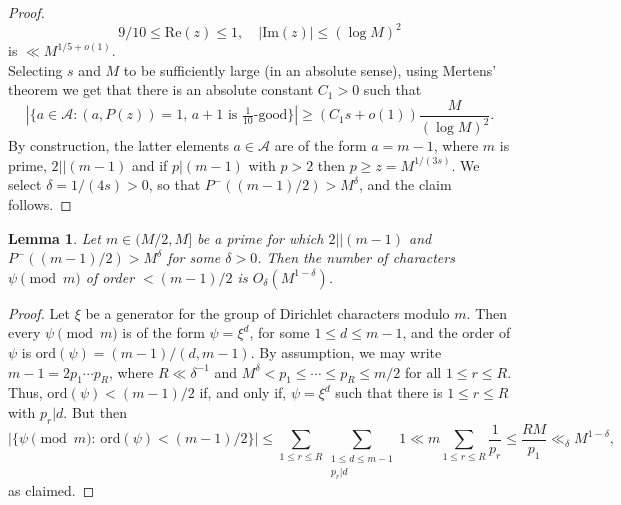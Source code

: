 \documentclass[10pt]{amsart}
\newtheorem{lem}[thm]{Lemma}
\theoremstyle{definition}
\newcommand{\mc}{\mathcal}
\renewcommand{\ss}{\substack}
\begin{document}
\begin{proof}
$$
9/10 \leq \text{Re}(z) \leq 1, \quad |\text{Im}(z)| \leq (\log M)^2
$$ 
is $\ll M^{1/5+o(1)}$. \\
Selecting $s$ and $M$ to be sufficiently large (in an absolute sense), using Mertens' theorem we get that there is an absolute constant $C_1 > 0$ such that 
$$
|\{a \in \mc{A} : (a,P(z)) = 1, \, a+1 \text{ is  $\tfrac{1}{10}$-good}\}| \geq \left(C_1s + o(1)\right)\frac{M}{(\log M)^2}.
$$
By construction, the latter elements $a \in \mc{A}$ are of the form $a = m-1$, where $m$ is prime, $2||(m-1)$ and if $p|(m-1)$ with $p > 2$ then $p \geq z = M^{1/(3s)}$.
We select $\delta = 1/(4s) > 0$, so that $P^-((m-1)/2) > M^{\delta}$, and the claim follows. 
\end{proof}
\begin{lem}\label{lem:largeOrd}
Let $m \in (M/2,M]$ be a prime for which $2||(m-1)$ and $P^-((m-1)/2) > M^{\delta}$ for some $\delta > 0$. Then the number of characters $\psi \pmod{m}$ of order $< (m-1)/2$ is $O_{\delta}(M^{1-\delta})$. 
\end{lem}
\begin{proof}
Let $\xi$ be a generator for the group of Dirichlet characters modulo $m$. Then every  $\psi \pmod{m}$ is of the form $\psi = \xi^d$, for some $1 \leq d \leq m-1$, and the order of $\psi$ is $\text{ord}(\psi) = (m-1)/(d,m-1)$. By assumption, we may write $m-1 = 2p_1\cdots p_R$, where $R \ll \delta^{-1}$ and $M^{\delta} < p_1 \leq \cdots \leq p_R \leq m/2$ for all $1 \leq r \leq R$. Thus, $\text{ord}(\psi) < (m-1)/2$ if, and only if, $\psi = \xi^d$ such that there is $1 \leq r \leq R$ with $p_r|d$. But then
$$
|\{\psi \pmod{m} : \, \text{ord}(\psi) < (m-1)/2\}| \leq \sum_{1 \leq r \leq R} \sum_{\ss{1 \leq d \leq m-1 \\ p_r|d}} 1 \ll m \sum_{1 \leq r \leq R} \frac{1}{p_r} \leq \frac{RM}{p_1} \ll_{\delta} M^{1-\delta},
$$
as claimed.
\end{proof}
\end{document}
